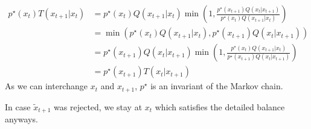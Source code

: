 \begin{itemize}
\begin{equation*}
		\begin{split}
			p^{\star}(x_t)T(x_{t+1}|x_{t}) & = p^{\star}(x_t)Q(x_{t+1}|x_{t})\min\left(1, \frac{p^{\star}(x_{t+1}) Q(x_t|x_{t+1})}{p^{\star}(x_t)Q(x_{t+1}|x_{t})}\right)\\
			& = \min\left(p^{\star}(x_t)Q(x_{t+1}|x_{t}), p^{\star}(x_{t+1}) Q(x_t|x_{t+1})\right)\\
			& = p^{\star}(x_{t+1})Q(x_{t}|x_{t+1})\min\left(1, \frac{p^{\star}(x_{t}) Q(x_{t+1}|x_{t})}{p^{\star}(x_{t+1})Q(x_{t}|x_{t+1})}\right)\\
			& = p^{\star}(x_{t+1})T(x_{t}|x_{t+1})
		\end{split}
	\end{equation*}
	As we can interchange $x_t$ and $x_{t+1}$, $p^{\star}$ is an invariant of the Markov chain.
	
	In case $\tilde{x}_{t+1}$ was rejected, we stay at $x_t$ which satisfies the detailed balance anyways.
\end{itemize}
